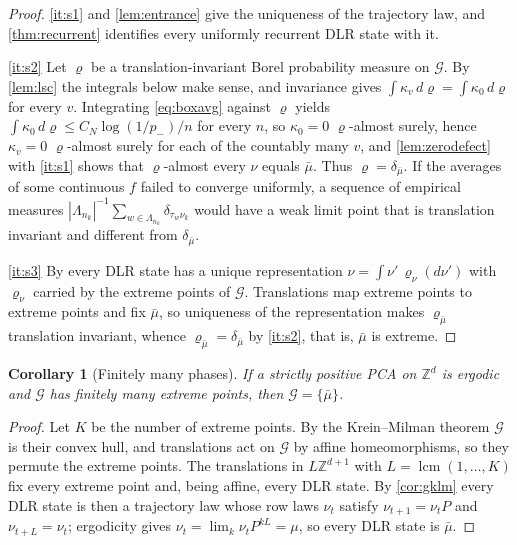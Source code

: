 \documentclass[11pt]{article}
\theoremstyle{plain}
\newtheorem{corollary}[theorem]{Corollary}
\theoremstyle{definition}
\theoremstyle{remark}
\newcommand{\Z}{\mathbb{Z}}
\newcommand{\Lam}{\Lambda}
\newcommand{\ba}{\bar{\mu}}
\begin{document}
\begin{proof}
\ref{it:s1}  and \cref{lem:entrance} give the uniqueness of the trajectory law, and \cref{thm:recurrent} identifies every uniformly recurrent DLR state with it.

\ref{it:s2} Let $\varrho$ be a translation-invariant Borel probability measure on $\mathcal G$. By \cref{lem:lsc} the integrals below make sense, and invariance gives $\int\kappa_v\,d\varrho=\int\kappa_0\,d\varrho$ for every $v$. Integrating \eqref{eq:boxavg} against $\varrho$ yields $\int\kappa_0\,d\varrho\le C_N\log(1/p_-)/n$ for every $n$, so $\kappa_0=0$ $\varrho$-almost surely, hence $\kappa_v=0$ $\varrho$-almost surely for each of the countably many $v$, and \cref{lem:zerodefect} with \ref{it:s1} shows that $\varrho$-almost every $\nu$ equals $\ba$. Thus $\varrho=\delta_{\ba}$. If the averages of some continuous $f$ failed to converge uniformly, a sequence of empirical measures $|\Lam_{n_k}|^{-1}\sum_{w\in\Lam_{n_k}}\delta_{\tau_w\nu_k}$ would have a weak limit point that is translation invariant and different from $\delta_{\ba}$.

\ref{it:s3} By \cite[Theorem~7.26]{Georgii11} every DLR state has a unique representation $\nu=\int\nu'\,\varrho_\nu(d\nu')$ with $\varrho_\nu$ carried by the extreme points of $\mathcal G$. Translations map extreme points to extreme points and fix $\ba$, so uniqueness of the representation makes $\varrho_{\ba}$ translation invariant, whence $\varrho_{\ba}=\delta_{\ba}$ by \ref{it:s2}, that is, $\ba$ is extreme.
\end{proof}

\begin{corollary}[Finitely many phases]
\label{cor:finitephase}
If a strictly positive PCA on $\Z^d$ is ergodic and $\mathcal G$ has finitely many extreme points, then $\mathcal G=\{\ba\}$.
\end{corollary}

\begin{proof}
Let $K$ be the number of extreme points. By the Krein--Milman theorem $\mathcal G$ is their convex hull, and translations act on $\mathcal G$ by affine homeomorphisms, so they permute the extreme points. The translations in $L\Z^{d+1}$ with $L=\operatorname{lcm}(1,\dots,K)$ fix every extreme point and, being affine, every DLR state. By \cref{cor:gklm} every DLR state is then a trajectory law whose row laws $\nu_t$ satisfy $\nu_{t+1}=\nu_tP$ and $\nu_{t+L}=\nu_t$; ergodicity gives $\nu_t=\lim_k\nu_tP^{kL}=\mu$, so every DLR state is $\ba$.
\end{proof}
\end{document}
